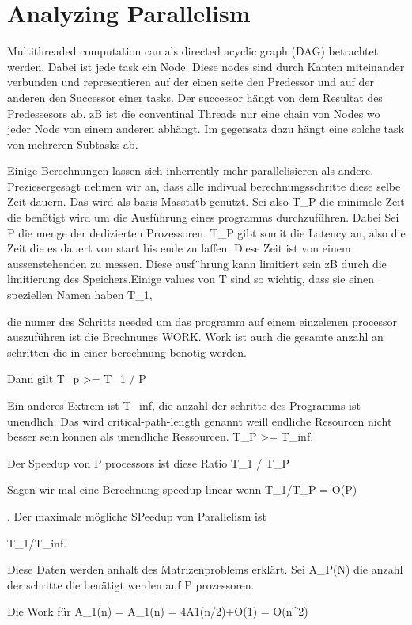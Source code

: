 \section{Analyzing Parallelism}

Multithreaded computation can als directed acyclic graph (DAG) betrachtet werden. Dabei ist jede task ein Node. Diese nodes sind durch Kanten miteinander verbunden und representieren auf der einen seite den Predessor und auf der anderen den Successor einer tasks. Der successor hängt von dem Resultat des Predessesors ab. zB ist die conventinal Threads nur eine chain von Nodes wo jeder Node von einem anderen abhängt. Im gegensatz dazu hängt eine solche task von mehreren Subtasks ab.

Einige Berechnungen lassen sich inherrently mehr parallelisieren als andere. Preziesergesagt nehmen wir an, dass alle indivual berechnungsschritte diese selbe Zeit dauern. Das wird als basis Masstatb genutzt. Sei also 
T_P 
die minimale Zeit die benötigt wird um die Ausführung eines programms durchzuführen. Dabei Sei P die menge der dedizierten Prozessoren. 
T_P
 gibt somit die Latency an, also die Zeit die es dauert von start bis ende zu laffen. Diese Zeit ist von einem aussenstehenden zu messen. Diese ausf¨hrung kann limitiert sein zB durch die limitierung des Speichers.Einige values von T sind so wichtig, dass sie einen speziellen Namen haben 
 T_1,

 die numer des Schritts needed um das programm auf einem einzelenen processor auszuführen ist die Brechnungs WORK. Work ist auch die gesamte anzahl an schritten die in einer berechnung benötig werden. 

Dann gilt T_p >= T_1 / P

Ein anderes Extrem ist 
T_inf, 
die anzahl der schritte des Programms ist unendlich. Das wird critical-path-length genannt weill endliche Resourcen nicht besser sein können als unendliche Ressourcen. 
T_P >= T_inf.


Der Speedup von P processors ist diese Ratio T_1 / T_P


Sagen wir mal eine Berechnung speedup linear wenn 
T_1/T_P = O(P)

. Der maximale mögliche SPeedup von Parallelism ist 

T_1/T_inf. 

Diese Daten werden anhalt des Matrizenproblems erklärt. Sei A_P(N) die anzahl der schritte die benätigt werden auf P prozessoren. 


Die Work für A_1(n) = A_1(n) = 4A1(n/2)+O(1) = O(n^2)


